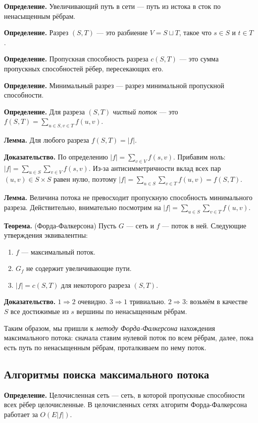 \textbf{Определение.} Увеличивающий путь в сети --- путь из истока в сток по ненасыщенным рёбрам.

\textbf{Определение.} Разрез $(S, T)$ --- это разбиение $V = S \sqcup T$, такое что $s \in S$ и $t \in T$.

\textbf{Определение.} Пропускная способность разреза $c(S, T)$ --- это сумма пропускных способностей рёбер, пересекающих его.

\textbf{Определение.} Минимальный разрез --- разрез минимальной пропускной способности.

\textbf{Определение.} Для разреза $(S, T)$ \textit{чистый поток} --- это $f(S, T) = \sum_{u \in S, v \in T} f(u, v)$.

\textbf{Лемма.} Для любого разреза $f(S, T) = |f|$.

\textbf{Доказательство.} По определению $|f| = \sum_{v \in V} f(s, v)$.
Прибавим ноль: $|f| = \sum_{u \in S} \sum_{v \in V} f(s, v)$.
Из-за антисимметричности вклад всех пар $(u, v) \in S \times S$ равен нулю, поэтому $|f| = \sum_{u \in S} \sum_{v \in T} f(u, v) = f(S, T)$.

\sloppy \textbf{Лемма.} Величина потока не превосходит пропускную способность минимального разреза. Действительно, внимательно посмотрим на $|f| = \sum_{u \in S} \sum_{v \in T} f(u, v)$.

\textbf{Теорема.} (Форда-Фалкерсона) Пусть $G$ --- сеть и $f$ --- поток в ней. Следующие утверждения эквивалентны:
\begin{enumerate}
    \item $f$ --- максимальный поток.
    \item $G_f$ не содержит увеличивающие пути.
    \item $|f| = c(S, T)$ для некоторого разреза $(S, T)$.
\end{enumerate}

\textbf{Доказательство.} $1 \Rightarrow 2$ очевидно. $3 \Rightarrow 1$ тривиально.
$2 \Rightarrow 3$: возьмём в качестве $S$ все достижимые из $s$ вершины по ненасыщенным рёбрам.

Таким образом, мы пришли к \textit{методу Форда-Фалкерсона} нахождения максимального потока: сначала ставим нулевой поток по всем рёбрам, далее, пока есть путь по ненасыщенным рёбрам, проталкиваем по нему поток.

\subsection{Алгоритмы поиска максимального потока}
\textbf{Определение.} Целочисленная сеть --- сеть, в которой пропускные способности всех рёбер целочисленные.
В целочисленных сетях алгоритм Форда-Фалкерсона работает за $O(E |f|)$.

